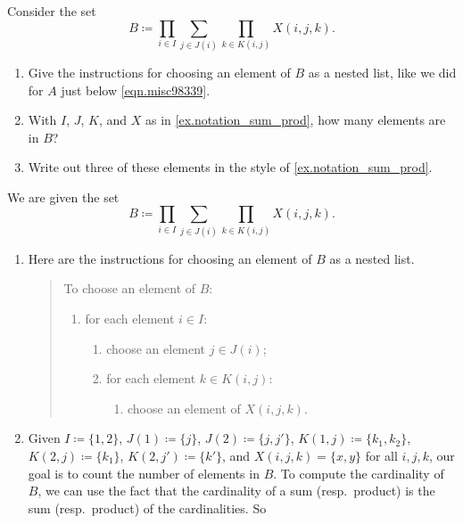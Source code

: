 \documentclass[Book-Poly]{subfiles}
\begin{document}
\begin{exercise}
Consider the set
\begin{equation}\label{eqn.prod_sum_prod}B \coloneqq \prod_{i\in I}\sum_{j\in J(i)}\prod_{k\in K(i,j)}X(i,j,k).\end{equation}
\begin{enumerate}
	\item Give the instructions for choosing an element of $B$ as a nested list, like we did for $A$ just below \eqref{eqn.misc98339}.
	\item With $I$, $J$, $K$, and $X$ as in \cref{ex.notation_sum_prod}, how many elements are in $B$?
	\item Write out three of these elements in the style of \cref{ex.notation_sum_prod}.
\qedhere
\end{enumerate}
\begin{solution}
We are given the set
\[
    B \coloneqq \prod_{i\in I}\sum_{j\in J(i)}\prod_{k\in K(i,j)}X(i,j,k).
\]
\begin{enumerate}
	\item Here are the instructions for choosing an element of $B$ as a nested list.
	\begin{quote}
	    To choose an element of $B$:
	    \begin{enumerate}[label=\arabic*.]
	        \item for each element $i \in I$:
	        \begin{enumerate}[label*=\arabic*.]
	            \item choose an element $j \in J(i)$;
	            \item for each element $k \in K(i, j)$:
	            \begin{enumerate}[label*=\arabic*.]
	                \item choose an element of $X(i,j,k)$.
	            \end{enumerate}
	        \end{enumerate}
	    \end{enumerate}
	\end{quote}
	\item Given $I\coloneqq\{1,2\}$, $J(1)\coloneqq\{j\}$, $J(2)\coloneqq\{j,j'\}$, $K(1,j)\coloneqq\{k_1,k_2\}$, $K(2,j)\coloneqq\{k_1\}$, $K(2,j')\coloneqq\{k'\}$, and $X(i,j,k)=\{x,y\}$ for all $i,j,k$, our goal is to count the number of elements in $B$.
	To compute the cardinality of $B$, we can use the fact that the cardinality of a sum (resp.\ product) is the sum (resp.\ product) of the cardinalities.
	So
	\begin{align*}

\end{align*}
\end{enumerate}
\end{solution}
\end{exercise}
\end{document}

